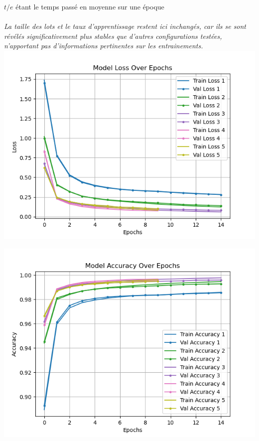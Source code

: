 \begin{multicols}{2}
{$t/e$ étant le temps passé en moyenne sur une époque \\
} \\
\textit{La taille des lots et le taux d’apprentissage restent ici inchangés, car ils se sont révélés significativement plus stables 
que d'autres configurations testées, n'apportant pas d’informations pertinentes sur les entrainements.} \\


\includegraphics[width=\columnwidth]{images/mnist_losses.png}
\hfill\break

\includegraphics[width=\columnwidth]{images/mnist_accuracies.png}
\hfill\break


\end{multicols}
